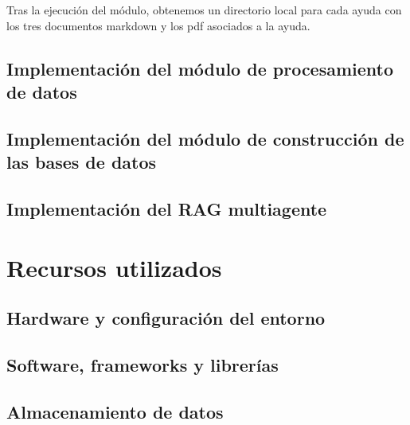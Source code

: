 Tras la ejecución del módulo, obtenemos un directorio local para cada ayuda con los tres documentos markdown y los pdf asociados a la ayuda.


\subsection{Implementación del módulo de procesamiento de datos}


\subsection{Implementación del módulo de construcción de las bases de datos}


\subsection{Implementación del RAG multiagente}



\section{Recursos utilizados}


\subsection{Hardware y configuración del entorno}


\subsection{Software, frameworks y librerías}


\subsection{Almacenamiento de datos}


